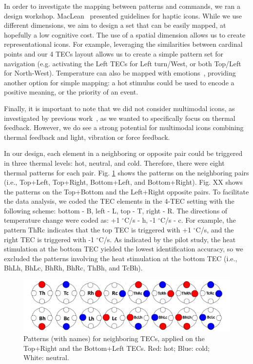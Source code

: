\documentclass[preprint,12pt]{elsarticle}
\begin{document}
In order to investigate the mapping between patterns and commands, we ran a design workshop. MacLean~\cite{MacLean2008} presented guidelines for haptic icons. While we use different dimensions, we aim to design a set that can be easily mapped, at hopefully a low cognitive cost.
The use of a spatial dimension allows us to create representational icons. For example, leveraging the similarities between cardinal points and our 4 TECs layout allows us to create a simple pattern set for navigation (e.g. activating the Left TECs for Left turn/West, or both Top/Left for North-West). Temperature can also be mapped with emotions~\cite{35,37}, providing another option for simple mapping: a hot stimulus could be used to encode a positive meaning, or the priority of an event.

Finally, it is important to note that we did not consider multimodal icons, as investigated by previous work~\cite{Chan2008}, as we wanted to specifically focus on thermal feedback. However, we do see a strong potential for multimodal icons combining thermal feedback and light, vibration or force feedback.


In our design, each element in a neighboring or opposite pair could be triggered in three thermal levels: hot, neutral, and cold. Therefore, there were eight thermal patterns for each pair. Fig. \ref{fig:9} shows the  patterns on the neighboring pairs (i.e., Top+Left, Top+Right, Bottom+Left, and Bottom+Right). Fig. XX shows the patterns on the Top+Bottom and the Left+Right opposite pairs. To facilitate the data analysis, we coded the TEC elements in the 4-TEC setting with the following scheme: bottom - B, left - L, top - T, right - R. The directions of temperature change were coded as: +1 $^{\circ}$C/s - h, -1 $^{\circ}$C/s - c. For example, the pattern ThRc indicates that the top TEC is triggered with +1 $^{\circ}$C/s, and the right TEC is triggered with -1 $^{\circ}$C/s. As indicated by the pilot study, the heat stimulation at the bottom TEC yielded the lowest identification accuracy, so we excluded the patterns involving the heat stimulation at the bottom TEC (i.e., BhLh, BhLc, BhRh, BhRc, ThBh, and TcBh).


\begin{figure}[tp]
  \centering
  \includegraphics[width=0.9\columnwidth]{img/fig9.pdf}
  \caption{Patterns (with names) for neighboring TECs, applied on the Top+Right and the Bottom+Left TECs. Red: hot; Blue: cold; White: neutral.}
  \label{fig:9}
\end{figure}
\end{document}
